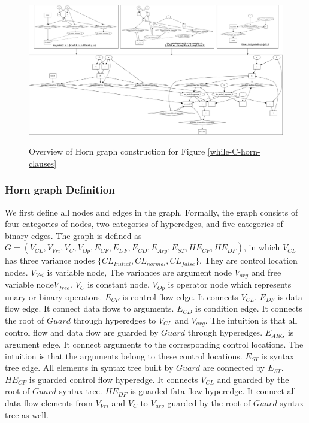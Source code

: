 \documentclass{article}
\begin{document}
\begin{figure}[h]
\centering
  \includegraphics[width=16cm]{graph/overall-transformation}\\
  \caption{Overview of Horn graph construction for Figure \ref{while-C-horn-clauses}}\label{overall-transformation}
\end{figure}


\subsubsection{Horn graph Definition}



We first define all nodes and edges in the graph. Formally, the graph consists of four categories of nodes, two categories of hyperedges, and five categories of binary edges. The graph is defined as $G=(V_{CL},V_{Vri},V_{C},V_{Op},E_{CF},E_{DF},E_{CD},E_{Arg},E_{ST},HE_{CF},HE_{DF})$, in which $V_{CL}$ has three variance nodes $\{CL_{Initial},CL_{normal},CL_{false}\}$. They are control location nodes. $V_{Vri}$ is variable node, The variances are argument node $V_{arg}$ and free variable node$V_{free}$. $V_{C}$ is constant node. $V_{Op}$ is operator node which represents unary or binary operators.
$E_{CF}$ is control flow edge. It connects $V_{CL}$. $E_{DF}$ is data flow edge. It connect data flows to arguments. $E_{CD}$ is condition edge. It connects the root of $Guard$ through hyperedges to $V_{CL}$ and $V_{arg}$. The intuition is that all control flow and data flow are guarded by $Guard$ through hyperedges. $E_{ARG}$ is argument edge. It connect arguments to the corresponding control locations. The intuition is that the arguments belong to these control locations. $E_{ST}$ is syntax tree edge. All elements in syntax tree built by $Guard$ are connected by $E_{ST}$. $HE_{CF}$ is guarded control flow hyperedge. It connects $V_{CL}$ and guarded by the root of $Guard$ syntax tree. $HE_{DF}$ is guarded fata flow hyperedge. It connect all data flow elements from $V_{Vri}$ and $V_{C}$ to $V_{arg}$ guarded by the root of $Guard$ syntax tree as well.
\end{document}
